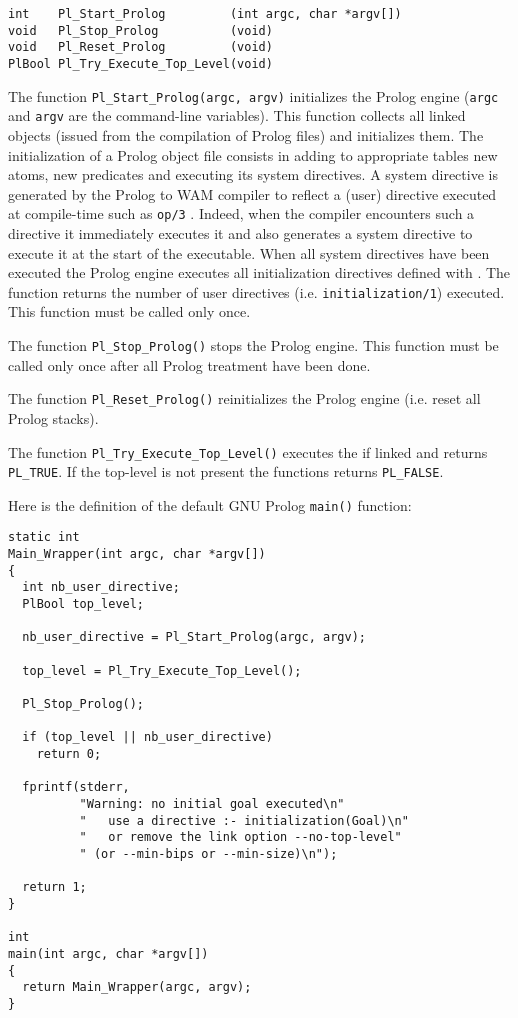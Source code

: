 \begin{Indentation}
\begin{verbatim}
int    Pl_Start_Prolog         (int argc, char *argv[])
void   Pl_Stop_Prolog          (void)
void   Pl_Reset_Prolog         (void)
PlBool Pl_Try_Execute_Top_Level(void)
\end{verbatim}
\end{Indentation}

The function \texttt{Pl\_Start\_Prolog(argc, argv)} initializes the Prolog
engine (\texttt{argc} and \texttt{argv} are the command-line variables). This
function collects all linked objects (issued from the compilation of Prolog
files) and initializes them. The initialization of a Prolog object file
consists in adding to appropriate tables new atoms, new predicates and
executing its system directives. A system directive is generated by the
Prolog to WAM compiler to reflect a (user) directive executed at compile-time
such as \texttt{op/3} . Indeed, when the compiler encounters such
a directive it immediately executes it and also generates a system directive
to execute it at the start of the executable.  When all system directives
have been executed the Prolog engine executes all initialization directives
defined with 
. The function returns the number of user
directives (i.e. \texttt{initialization/1}) executed. This function must be
called only once.

The function \texttt{Pl\_Stop\_Prolog()} stops the Prolog engine. This function
must be called only once after all Prolog treatment have been done.

The function \texttt{Pl\_Reset\_Prolog()} reinitializes the Prolog engine
(i.e. reset all Prolog stacks).

The function \texttt{Pl\_Try\_Execute\_Top\_Level()} executes the
 if linked  and returns
\texttt{PL\_TRUE}. If the top-level is not present the functions returns
\texttt{PL\_FALSE}.

Here is the definition of the default GNU Prolog \texttt{main()} function:

\begin{Indentation}
\begin{verbatim}
static int
Main_Wrapper(int argc, char *argv[])
{
  int nb_user_directive;
  PlBool top_level;

  nb_user_directive = Pl_Start_Prolog(argc, argv);

  top_level = Pl_Try_Execute_Top_Level();

  Pl_Stop_Prolog();

  if (top_level || nb_user_directive)
    return 0;

  fprintf(stderr,
          "Warning: no initial goal executed\n"
          "   use a directive :- initialization(Goal)\n"
          "   or remove the link option --no-top-level"
          " (or --min-bips or --min-size)\n");

  return 1;
}

int
main(int argc, char *argv[])
{
  return Main_Wrapper(argc, argv);
}
\end{verbatim}
\end{Indentation}

